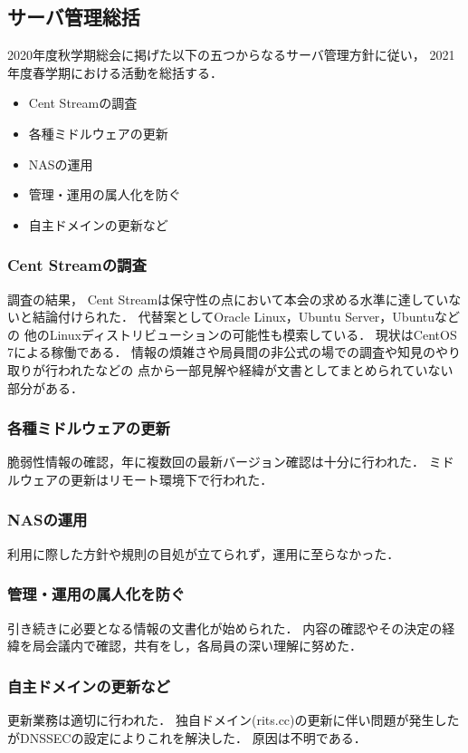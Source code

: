\subsection*{サーバ管理総括}


2020年度秋学期総会に掲げた以下の五つからなるサーバ管理方針に従い，
2021年度春学期における活動を総括する．
\begin{itemize}
    \item Cent Streamの調査
    \item 各種ミドルウェアの更新
    \item NASの運用
    \item 管理・運用の属人化を防ぐ
    \item 自主ドメインの更新など
\end{itemize}

\subsubsection*{Cent Streamの調査}
調査の結果，
Cent Streamは保守性の点において本会の求める水準に達していないと結論付けられた．
代替案としてOracle Linux，Ubuntu Server，Ubuntuなどの
他のLinuxディストリビューションの可能性も模索している．
現状はCentOS 7による稼働である．
情報の煩雑さや局員間の非公式の場での調査や知見のやり取りが行われたなどの
点から一部見解や経緯が文書としてまとめられていない部分がある．

\subsubsection*{各種ミドルウェアの更新}
脆弱性情報の確認，年に複数回の最新バージョン確認は十分に行われた．
ミドルウェアの更新はリモート環境下で行われた．

\subsubsection*{NASの運用}
利用に際した方針や規則の目処が立てられず，運用に至らなかった．

\subsubsection*{管理・運用の属人化を防ぐ}
引き続きに必要となる情報の文書化が始められた．
内容の確認やその決定の経緯を局会議内で確認，共有をし，各局員の深い理解に努めた．

\subsubsection*{自主ドメインの更新など}
更新業務は適切に行われた．
独自ドメイン(rits.cc)の更新に伴い問題が発生したがDNSSECの設定によりこれを解決した．
原因は不明である．
